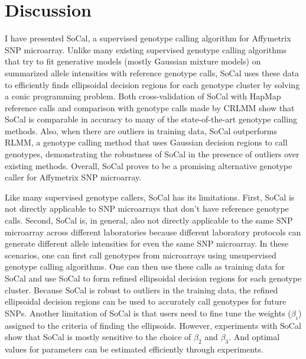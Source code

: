 \documentclass{scrartcl}
\begin{document}
\section{Discussion}

\par
I have presented SoCal, a supervised genotype calling algorithm for Affymetrix
SNP microarray.
Unlike many existing supervised genotype calling algorithms that try to fit
generative models (mostly Gaussian mixture models) on summarized allele
intensities with reference genotype calls, SoCal uses these data to efficiently
finds ellipsoidal decision regions for each genotype cluster by solving a conic
programming problem.
Both cross-validation of SoCal with HapMap reference calls and comparison with
genotype calls made by CRLMM show that SoCal is comparable in accuracy to many
of the state-of-the-art genotype calling methods.
Also, when there are outliers in training data, SoCal outperforms RLMM, a
genotype calling method that uses Gaussian decision regions to call genotypes,
demonstrating the robustness of SoCal in the presence of outliers over
existing methods.
Overall, SoCal proves to be a promising alternative genotype caller for
Affymetrix SNP microarray.

\par
Like many supervised genotype callers, SoCal has its limitations.
First, SoCal is not directly applicable to SNP microarrays that don't have
reference genotype calls.
Second, SoCal is, in general, also not directly applicable to the same SNP
microarray across different laboratories because different laboratory
protocols can generate different allele intensities for even the same
SNP microarray.
In these scenarios, one can first call genotypes from microarrays using
unsupervised genotype calling algorithms.
One can then use these calls as training data for SoCal and use SoCal to
form refined ellipsoidal decision regions for each genotype cluster.
Because SoCal is robust to outliers in the training data, the refined
ellipsoidal decision regions can be used to accurately call genotypes for
future SNPs.
Another limitation of SoCal is that users need to fine tune the weights
($\beta_i$) assigned to the criteria of finding the ellipsoids.
However, experiments with SoCal show that SoCal is mostly sensitive to the
choice of $\beta_2$ and $\beta_3$.
And optimal values for parameters can be estimated efficiently
through experiments.
\end{document}
